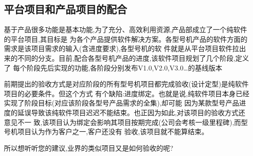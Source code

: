 \documentclass[11pt]{article}
\begin{document}
\subsection{平台项目和产品项目的配合}
\begin{staff}
  \qlogo 基于产品很多功能是基本功能,为了充分、高效利用资源,产品部成立了一个纯软件的平台项目,其目标是
  为各个产品提供软件解决方案。各型号机产品的软件方面的需求是该项目需求的输入(含进度要求),各型号机的软
  件就是从平台项目软件拉出来的不同的分支。目前,配合各型号机产品的进度,该软件项目规划了几个阶段,定义了
  每个阶段先后实现的功能,各阶段分别发布V1.0,V2.0,V3.0\ldots 的基线版本

  前期提出的验收方式是对应阶段的所有型号机项目都完成验收(设计定型)是纯软件项目的必要条件。但这个方式
  有个缺陷:进度绑定。也就是说,纯软件项目本身已经实现了阶段目标(对应该阶段各型号产品需求的全集),却可能
  因为某款型号产品进度的延误导致该纯软件项目迟迟不能结束。也正因为如此,对该项目的验收方式还意见不一
  致,该项目认为绑定会影响其项目按期完成(公司会考核一级里程碑),而型号机项目认为作为客户之一,客户还没有
  验收,该项目就不能算结束。

  所以想听听您的建议,业界的类似项目又是如何验收的呢?
\end{staff}
\end{document}
